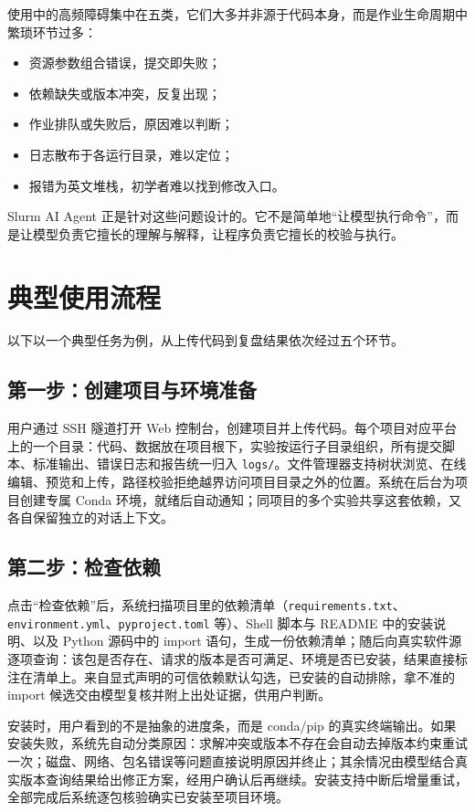 \documentclass[UTF8,11pt,a4paper]{ctexart}
\newcommand{\code}[1]{\texttt{\small #1}}
\begin{document}
使用中的高频障碍集中在五类，它们大多并非源于代码本身，而是作业生命周期中繁琐环节过多：
\begin{itemize}
  \item 资源参数组合错误，提交即失败；
  \item 依赖缺失或版本冲突，反复出现；
  \item 作业排队或失败后，原因难以判断；
  \item 日志散布于各运行目录，难以定位；
  \item 报错为英文堆栈，初学者难以找到修改入口。
\end{itemize}

Slurm AI Agent 正是针对这些问题设计的。它不是简单地“让模型执行命令”，而是让模型负责它擅长的理解与解释，让程序负责它擅长的校验与执行。

\section{典型使用流程}
以下以一个典型任务为例，从上传代码到复盘结果依次经过五个环节。

\subsection{第一步：创建项目与环境准备}
用户通过 SSH 隧道打开 Web 控制台，创建项目并上传代码。每个项目对应平台上的一个目录：代码、数据放在项目根下，实验按运行子目录组织，所有提交脚本、标准输出、错误日志和报告统一归入 \code{logs/}。文件管理器支持树状浏览、在线编辑、预览和上传，路径校验拒绝越界访问项目目录之外的位置。系统在后台为项目创建专属 Conda 环境，就绪后自动通知；同项目的多个实验共享这套依赖，又各自保留独立的对话上下文。


\subsection{第二步：检查依赖}
点击“检查依赖”后，系统扫描项目里的依赖清单（\code{requirements.txt}、\code{environment.yml}、\code{pyproject.toml} 等）、Shell 脚本与 README 中的安装说明、以及 Python 源码中的 import 语句，生成一份依赖清单；随后向真实软件源逐项查询：该包是否存在、请求的版本是否可满足、环境是否已安装，结果直接标注在清单上。来自显式声明的可信依赖默认勾选，已安装的自动排除，拿不准的 import 候选交由模型复核并附上出处证据，供用户判断。

安装时，用户看到的不是抽象的进度条，而是 conda/pip 的真实终端输出。如果安装失败，系统先自动分类原因：求解冲突或版本不存在会自动去掉版本约束重试一次；磁盘、网络、包名错误等问题直接说明原因并终止；其余情况由模型结合真实版本查询结果给出修正方案，经用户确认后再继续。安装支持中断后增量重试，全部完成后系统逐包核验确实已安装至项目环境。
\end{document}
